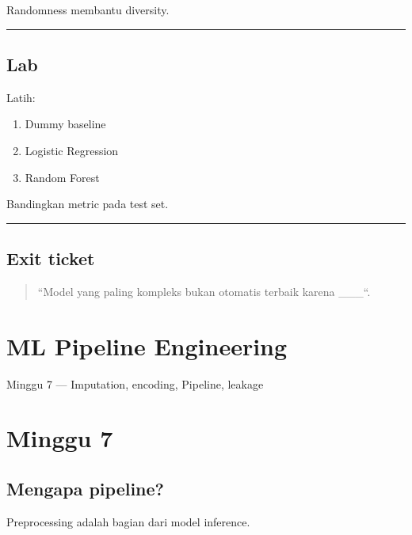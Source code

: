 \documentclass[
  indonesian,
  letterpaper,
  DIV=11,
  numbers=noendperiod]{scrreprt}
\providecommand{\tightlist}{%
  \setlength{\itemsep}{0pt}\setlength{\parskip}{0pt}}
\begin{document}
Randomness membantu diversity.

\begin{center}\rule{0.5\linewidth}{0.5pt}\end{center}

\section{Lab}\label{lab-3}

Latih:

\begin{enumerate}
\def\labelenumi{\arabic{enumi}.}
\tightlist
\item
  Dummy baseline
\item
  Logistic Regression
\item
  Random Forest
\end{enumerate}

Bandingkan metric pada test set.

\begin{center}\rule{0.5\linewidth}{0.5pt}\end{center}

\section{Exit ticket}\label{exit-ticket-2}

\begin{quote}
``Model yang paling kompleks bukan otomatis terbaik karena \_\_\_``.
\end{quote}

\chapter{ML Pipeline Engineering}\label{ml-pipeline-engineering}

Minggu 7 --- Imputation, encoding, Pipeline, leakage

\hfill\break

\chapter{Minggu 7}\label{minggu-7}

\section{Mengapa pipeline?}\label{mengapa-pipeline}

Preprocessing adalah bagian dari model inference.
\end{document}
